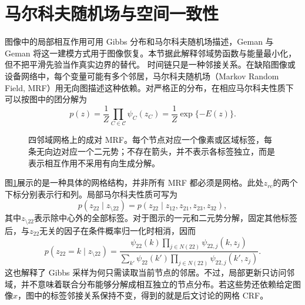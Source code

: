 \section{马尔科夫随机场与空间一致性}
图像中的局部相互作用可用 Gibbs 分布和马尔科夫随机场描述，Geman 与 Geman 将这一建模方式用于图像恢复\cite{geman1984mrf}。本节据此解释邻域势函数与能量最小化，但不把平滑先验当作真实边界的替代。
时间链只是一种邻接关系。在缺陷图像或设备网络中，每个变量可能有多个邻居，马尔科夫随机场（Markov Random Field, MRF）用无向图描述这种依赖。对严格正的分布，在相应马尔科夫性质下可以按图中的团分解为
\begin{equation}
 p(z)=\frac{1}{Z}\prod_{C\in\mathcal C}\psi_C(z_C)
 =\frac{1}{Z}\exp\{-E(z)\}.
\end{equation}
\begin{figure}[htbp]
\centering
{}
\caption{四邻域网格上的成对 MRF。每个节点对应一个像素或区域标签，每条无向边对应一个二元势；不存在箭头，并不表示各标签独立，而是表示相互作用不采用有向生成分解。}
\label{fig:bayes-mrf-structure}
\end{figure}
图\ref{fig:bayes-mrf-structure}展示的是一种具体的网格结构，并非所有 MRF 都必须是网格。此处$z_{rc}$的两个下标分别表示行和列。局部马尔科夫性质可写为
\begin{equation}
 p(z_{22}\mid z_{\setminus 22})
 =p(z_{22}\mid z_{12},z_{21},z_{23},z_{32}),
\end{equation}
其中$z_{\setminus 22}$表示除中心外的全部标签。对于图示的一元和二元势分解，固定其他标签后，与$z_{22}$无关的因子在条件概率归一化时相消，因而
\begin{equation}
 p(z_{22}=k\mid z_{\setminus 22})
 =\frac{\psi_{22}(k)\prod_{j\in N(22)}\psi_{22,j}(k,z_j)}
 {\sum_{k'}\psi_{22}(k')\prod_{j\in N(22)}\psi_{22,j}(k',z_j)}.
\end{equation}
这也解释了 Gibbs 采样为何只需读取当前节点的邻居。不过，局部更新只访问邻域，并不意味着联合分布能够分解成相互独立的节点分布。若这些势还依赖给定图像$x$，图中的标签邻接关系保持不变，得到的就是后文讨论的网格 CRF。

